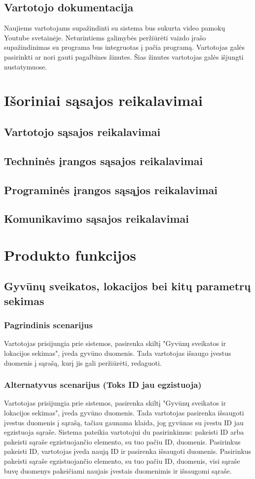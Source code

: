 \documentclass[oneside]{VUMIFPSkursinis}
\begin{document}
\subsection{Vartotojo dokumentacija}
Naujiems vartotojams supažindinti su sistema bus sukurta video pamokų Youtube svetainėje. Neturintiems galimybės peržiūrėti vaizdo įrašo supažindinimas su programa bus integruotas į pačia programą. Vartotojas galės pasirinkti ar nori gauti pagalbines žinutes. Šias žinutes vartotojas galės išjungti nustatymuose. 

\section{Išoriniai sąsajos reikalavimai}
\subsection{Vartotojo sąsajos reikalavimai}
\subsection{Techninės įrangos sąsajos reikalavimai}
\subsection{Programinės įrangos sąsąjos reikalavimai}
\subsection{Komunikavimo sąsajos reikalavimai}

\section{Produkto funkcijos}

\subsection{Gyvūnų sveikatos, lokacijos bei kitų parametrų sekimas}
\subsubsection{Pagrindinis scenarijus}
	Vartotojas prisijungia prie sistemos, pasirenka skiltį "Gyvūnų sveikatos ir lokacijos sekimas", įveda gyvūno duomenis. Tada vartotojas išsaugo įvestus duomenis į sąrašą, kurį jis gali peržiūrėti, redaguoti.
\subsubsection{Alternatyvus scenarijus (Toks ID jau egzistuoja)}
	Vartotojas prisijungia prie sistemos, pasirenka skiltį "Gyvūnų sveikatos ir lokacijos sekimas", įveda gyvūno duomenis. Tada vartotojas pasirenka išsaugoti įvestus duomenis į sąrašą, tačiau gaunama klaida, jog gyvūnas su įvestu ID jau egzistuoja sąraše. Sistema pateikia vartotojui du pasirinkimus: pakeisti ID arba pakeisti sąraše egzistuojančio elemento, su tuo pačiu ID, duomenis.
	Pasirinkus pakeisti ID, vartotojas įveda naują ID ir pasirenka išsaugoti duomenis. 
	Pasirinkus pakeisti sąraše egzistuojančio elemento, su tuo pačiu ID, duomenis, visi sąraše buvę duomenys pakeičiami naujais įvestais duomenimis ir išsaugomi sąraše.
\end{document}
